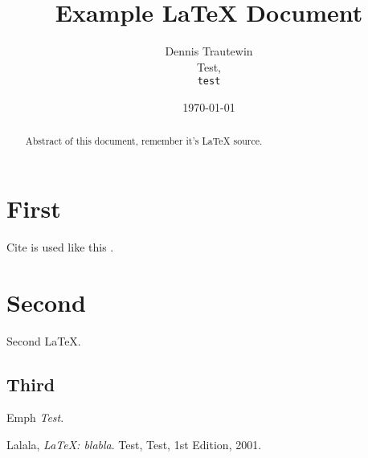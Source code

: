 \documentclass{article}
\begin{document}
\title{Example \LaTeX{} Document}

\author{Dennis Trautewin\\
        Test,\\
		\texttt{test}}
\date{\today}
\maketitle

\begin{abstract}
Abstract of this document, remember it's \LaTeX{} source.
\end{abstract}

\section{First}
Cite is used like this \cite{test01}.

\section{Second}
Second \LaTeX{}.

\subsection{Third}
Emph \emph{Test}.

\begin{thebibliography}{9}
	  Lalala,
	  \emph{\LaTeX: blabla}.
	  Test, Test,
	  1st Edition,
	  2001.
\end{thebibliography}
\end{document}
